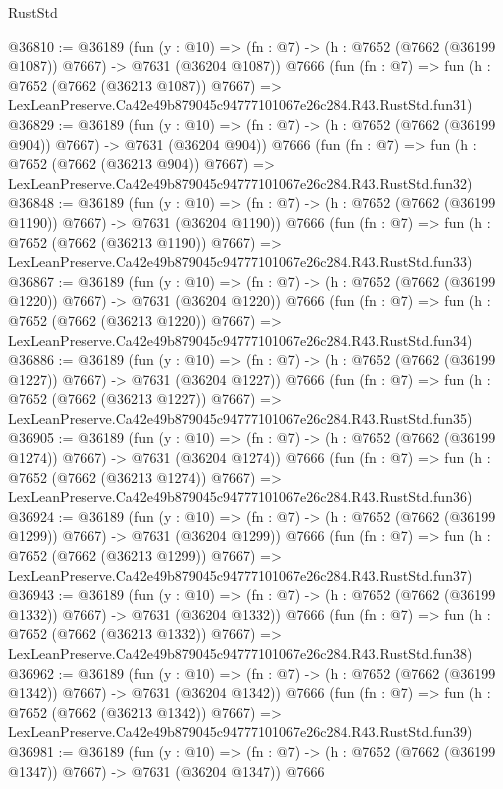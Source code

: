 \begin{lexlean}{RustStd}
\begin{coremodule}
@36810 := @36189
    (fun (y : @10) => (fn : @7) -> (h : @7652 (@7662 (@36199 @1087)) @7667) -> @7631 (@36204 @1087))
    @7666
    (fun (fn : @7) =>
    fun (h : @7652 (@7662 (@36213 @1087)) @7667) =>
    LexLeanPreserve.Ca42e49b879045c94777101067e26c284.R43.RustStd.fun31)
@36829 := @36189
    (fun (y : @10) => (fn : @7) -> (h : @7652 (@7662 (@36199 @904)) @7667) -> @7631 (@36204 @904))
    @7666
    (fun (fn : @7) =>
    fun (h : @7652 (@7662 (@36213 @904)) @7667) =>
    LexLeanPreserve.Ca42e49b879045c94777101067e26c284.R43.RustStd.fun32)
@36848 := @36189
    (fun (y : @10) => (fn : @7) -> (h : @7652 (@7662 (@36199 @1190)) @7667) -> @7631 (@36204 @1190))
    @7666
    (fun (fn : @7) =>
    fun (h : @7652 (@7662 (@36213 @1190)) @7667) =>
    LexLeanPreserve.Ca42e49b879045c94777101067e26c284.R43.RustStd.fun33)
@36867 := @36189
    (fun (y : @10) => (fn : @7) -> (h : @7652 (@7662 (@36199 @1220)) @7667) -> @7631 (@36204 @1220))
    @7666
    (fun (fn : @7) =>
    fun (h : @7652 (@7662 (@36213 @1220)) @7667) =>
    LexLeanPreserve.Ca42e49b879045c94777101067e26c284.R43.RustStd.fun34)
@36886 := @36189
    (fun (y : @10) => (fn : @7) -> (h : @7652 (@7662 (@36199 @1227)) @7667) -> @7631 (@36204 @1227))
    @7666
    (fun (fn : @7) =>
    fun (h : @7652 (@7662 (@36213 @1227)) @7667) =>
    LexLeanPreserve.Ca42e49b879045c94777101067e26c284.R43.RustStd.fun35)
@36905 := @36189
    (fun (y : @10) => (fn : @7) -> (h : @7652 (@7662 (@36199 @1274)) @7667) -> @7631 (@36204 @1274))
    @7666
    (fun (fn : @7) =>
    fun (h : @7652 (@7662 (@36213 @1274)) @7667) =>
    LexLeanPreserve.Ca42e49b879045c94777101067e26c284.R43.RustStd.fun36)
@36924 := @36189
    (fun (y : @10) => (fn : @7) -> (h : @7652 (@7662 (@36199 @1299)) @7667) -> @7631 (@36204 @1299))
    @7666
    (fun (fn : @7) =>
    fun (h : @7652 (@7662 (@36213 @1299)) @7667) =>
    LexLeanPreserve.Ca42e49b879045c94777101067e26c284.R43.RustStd.fun37)
@36943 := @36189
    (fun (y : @10) => (fn : @7) -> (h : @7652 (@7662 (@36199 @1332)) @7667) -> @7631 (@36204 @1332))
    @7666
    (fun (fn : @7) =>
    fun (h : @7652 (@7662 (@36213 @1332)) @7667) =>
    LexLeanPreserve.Ca42e49b879045c94777101067e26c284.R43.RustStd.fun38)
@36962 := @36189
    (fun (y : @10) => (fn : @7) -> (h : @7652 (@7662 (@36199 @1342)) @7667) -> @7631 (@36204 @1342))
    @7666
    (fun (fn : @7) =>
    fun (h : @7652 (@7662 (@36213 @1342)) @7667) =>
    LexLeanPreserve.Ca42e49b879045c94777101067e26c284.R43.RustStd.fun39)
@36981 := @36189
    (fun (y : @10) => (fn : @7) -> (h : @7652 (@7662 (@36199 @1347)) @7667) -> @7631 (@36204 @1347))
    @7666

\end{coremodule}
\end{lexlean}
